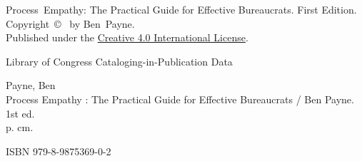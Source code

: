 \thispagestyle{empty}

\noindent Process~Empathy: The Practical Guide for Effective Bureaucrats. First Edition. \\Copyright~\copyright~\the\year{}
 by Ben~Payne. \\
Published under the \href{https://creativecommons.org/licenses/by-nc/4.0/}{Creative 
\iftoggle{narrowpage}{Commons Attribution-\\NonCommercial}{Commons Attribution-NonCommercial}
4.0 International License}.




\vspace*{\fill}



\noindent Library of Congress Cataloging-in-Publication Data

\noindent Payne, Ben\\
Process Empathy : The Practical Guide for Effective Bureaucrats / Ben Payne. 1st ed.\\
p. cm.

\noindent ISBN 979-8-9875369-0-2
